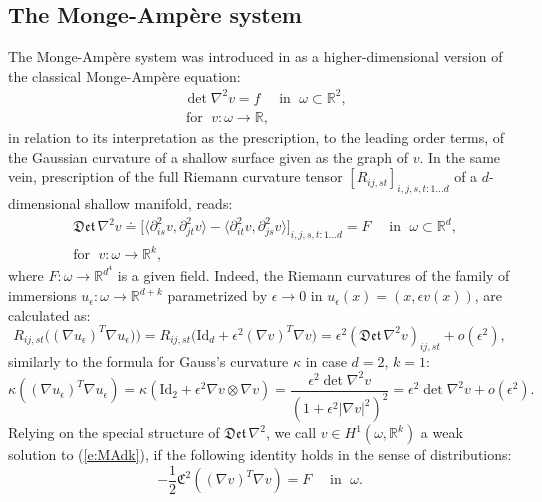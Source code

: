 \documentclass[reqno,twoside,11pt]{amsart}
\newcommand{\R}{\mathbb{R}}
\numberwithin{equation}{section}
\theoremstyle{plain}
\theoremstyle{definition}
\begin{document}
\subsection{The Monge-Amp\`ere system} 
The Monge-Amp\`ere system was introduced in \cite{lew_conv} as a
higher-dimensional version of the classical Monge-Amp\`ere equation:
\begin{equation}\label{e:MA}
\begin{split}
& \det \nabla^2 v =f \quad \text{ in } \; \omega \subset \R^2,\\
& \, \mbox{for }\; v:\omega\to\R,
\end{split}
\end{equation}
in relation to its interpretation as the prescription, to the leading order terms, of the Gaussian
curvature of a shallow surface given as the graph of $v$.
In the same vein, prescription of the full Riemann curvature tensor
$[R_{ij, st}]_{i,j,s,t:1\ldots d}$ of a $d$-dimensional shallow
manifold, reads: %
\begin{equation}\label{e:MAdk}
\begin{split}
& \mathfrak{Det}\, \nabla^2 v \doteq \big[\langle\partial^2_{is}v,\partial^2_{jt}v\rangle - 
\langle\partial^2_{it}v,\partial^2_{js}v\rangle\big]_{i,j,s,t:1\ldots d}
= F \quad \text{ in } \; \omega \subset \R^d,\\
& \mbox{for }\; v:\omega\to\R^k,
\end{split}
\end{equation}
where $F:\omega\to\R^{d^4}$ is a given field. 
Indeed, the Riemann curvatures of the family of immersions $u_\epsilon
:\omega\to\R^{d+k}$ parametrized by $\epsilon\to 0$ in
$u_\epsilon(x) = (x, \epsilon v(x))$, are calculated as: 
$$R_{ij,st}\big((\nabla u_\epsilon)^T\nabla u_\epsilon)\big) =
R_{ij,st}\big(\mbox{Id}_d + \epsilon^2(\nabla v)^T \nabla v\big)=
\epsilon^2(\mathfrak{Det}\,\nabla^2v)_{ij,st} + o(\epsilon^2),$$ 
similarly to the formula for Gauss's curvature $\kappa$ in case $d=2$, $k=1$:
$$\kappa((\nabla u_\epsilon)^T\nabla
u_\epsilon)=\kappa(\mbox{Id}_2+\epsilon^2 \nabla v\otimes\nabla v)=
\frac{\epsilon^2\det \nabla^2v}{(1+\epsilon^2|\nabla v|^2)^2}
=\epsilon^2\det\nabla^2 v + o(\epsilon^2).$$ 
Relying on the special structure of $\mathfrak{Det}\,\nabla^2$, we
call $v\in H^1(\omega,\R^k)$ a {weak solution} to (\ref{e:MAdk}),
if the following identity holds in the sense of distributions: 
\begin{equation}\label{e:MA_weak}
-\frac{1}{2}\mathfrak{C}^2((\nabla v)^T\nabla v) = F \quad \text{ in } \; \omega.
\end{equation}
\end{document}
